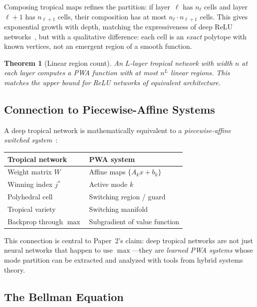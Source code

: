 \documentclass[11pt,twocolumn]{article}
\newtheorem{theorem}{Theorem}[section]
\begin{document}
Composing tropical maps refines the partition: if layer~$\ell$ has $n_\ell$
cells and layer~$\ell+1$ has $n_{\ell+1}$ cells, their composition has at
most $n_\ell \cdot n_{\ell+1}$ cells. This gives exponential growth with
depth, matching the expressiveness of deep ReLU
networks~\cite{montufar2014number}, but with a qualitative difference: each
cell is an \emph{exact} polytope with known vertices, not an emergent region
of a smooth function.

\begin{theorem}[Linear region count]\label{thm:regions}
An $L$-layer tropical network with width $n$ at each layer computes a PWA
function with at most $n^L$ linear regions. This matches the upper bound for
ReLU networks of equivalent architecture.
\end{theorem}

\subsection{Connection to Piecewise-Affine Systems}

A deep tropical network is mathematically equivalent to a \emph{piecewise-affine
switched system}~\cite{heemels2001equivalence}:

\begin{center}
\begin{tabular}{ll}
\toprule
\textbf{Tropical network} & \textbf{PWA system} \\
\midrule
Weight matrix $W$ & Affine maps $\{A_k x + b_k\}$ \\
Winning index $j^*$ & Active mode $k$ \\
Polyhedral cell & Switching region / guard \\
Tropical variety & Switching manifold \\
Backprop through $\max$ & Subgradient of value function \\
\bottomrule
\end{tabular}
\end{center}

This connection is central to Paper~2's claim: deep tropical networks are not
just neural networks that happen to use $\max$---they are \emph{learned PWA
systems} whose mode partition can be extracted and analyzed with tools from
hybrid systems theory.

\subsection{The Bellman Equation}
\end{document}
